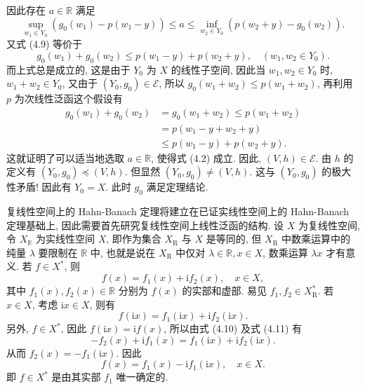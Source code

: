 \documentclass[openany]{ctexbook}
\makeatletter
\theoremstyle{kaiti}
\theoremstyle{normal}
\renewenvironment{proof}[1][\proofname]{\par
    \pushQED{\qed}%
    \normalfont \topsep6\p@\@plus6\p@\relax
    \trivlist
    \item\relax
    {\heiti #1}\hspace{2\labelsep}\ignorespaces
  }{%
    \popQED\endtrivlist\@endpefalse
  }
\makeatother
\begin{document}
\begin{proof}
$$$$
因此存在 $a \in \mathbb{R}$ 满足
$$
\sup_{w_1 \in Y_0}\left(g_0\left(w_1\right)-p\left(w_1-y\right)\right) \leqslant a \leqslant \inf_{w_2 \in Y_0}\left(p\left(w_2+y\right)-g_0\left(w_2\right)\right).
$$
又式 (4.9) 等价于
$$
g_0\left(w_1\right)+g_0\left(w_2\right) \leqslant p\left(w_1-y\right)+p\left(w_2+y\right), \quad\left(w_1, w_2 \in Y_0\right).
$$
而上式总是成立的, 这是由于 $Y_0$ 为 $X$ 的线性子空间, 因此当 $w_1, w_2 \in Y_0$ 时, $w_1+w_2 \in Y_0$, 又由于 $\left(Y_0, g_0\right) \in \mathcal{E}$, 所以 $g_0\left(w_1+w_2\right) \leqslant p\left(w_1+w_2\right)$, 再利用 $p$ 为次线性泛函这个假设有
$$
\begin{aligned}
g_0\left(w_1\right)+g_0\left(w_2\right) &=g_0\left(w_1+w_2\right) \leqslant p\left(w_1+w_2\right) \\
&=p\left(w_1-y+w_2+y\right) \\
& \leqslant p\left(w_1-y\right)+p\left(w_2+y\right).
\end{aligned}
$$
这就证明了可以适当地选取 $a \in \mathbb{R}$, 使得式 (4.2) 成立. 因此, $(V, h) \in \mathcal{E}$.
由 $h$ 的定义有 $\left(Y_0, g_0\right) \preccurlyeq(V, h)$. 但显然 $\left(Y_0, g_0\right) \neq(V, h)$. 这与 $\left(Y_0, g_0\right)$ 的极大性矛盾! 因此有 $Y_0=X$. 此时 $g_0$ 满足定理结论.
\end{proof}

复线性空间上的 Hahn-Banach 定理将建立在已证实线性空间上的 Hahn-Banach 定理基础上, 因此需要首先研究复线性空间上线性泛函的结构. 设 $X$ 为复线性空间, 令 $X_{\mathbb{R}}$ 为实线性空间 $X$, 即作为集合 $X_{\mathrm{R}}$ 与 $X$ 是等同的, 但 $X_{\mathrm{R}}$ 中数乘运算中的纯量 $\lambda$ 要限制在 $\mathbb{R}$ 中, 也就是说在 $X_{\mathrm{R}}$ 中仅对 $\lambda \in \mathbb{R}, x \in X$, 数乘运算 $\lambda x$ 才有意义. 若 $f \in X^{*}$, 则
\begin{equation}
  f(x)=f_1(x)+\mathrm{i} f_2(x), \quad x \in X,
\end{equation}
其中 $f_1(x), f_2(x) \in \mathbb{R}$ 分别为 $f(x)$ 的实部和虚部. 易见 $f_1, f_2 \in X_{\mathrm{R}}^{*}$. 若 $x \in X$, 考虑 $\mathrm{i} x \in X$, 则有
\begin{equation}
  f(\mathrm{i} x)=f_1(\mathrm{i} x)+\mathrm{i} f_2(\mathrm{i} x).
\end{equation}
另外, $f \in X^{*}$, 因此 $f(\mathrm{i} x)=\mathrm{i} f(x)$, 所以由式 (4.10) 及式 (4.11) 有
$$
-f_2(x)+\mathrm{i} f_1(x)=f_1(\mathrm{i} x)+\mathrm{i} f_2(\mathrm{i} x).
$$
从而 $f_2(x)=-f_1(\mathrm{i} x)$. 因此
$$
f(x)=f_1(x)-\mathrm{i} f_1(\mathrm{i} x), \quad x \in X.
$$
即 $f \in X^{*}$ 是由其实部 $f_1$ 唯一确定的.
\end{document}
